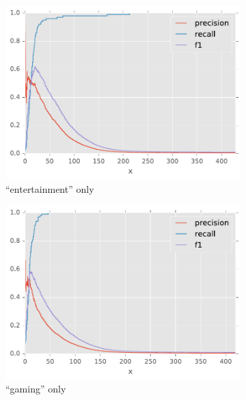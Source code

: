 \begin{figure}[H]
\begin{subfigure}[t]{.4\textwidth}
\centering\includegraphics[]{figures/reddit-entertainment-only-f1.pdf}
\caption{``entertainment'' only}
\label{fig-reddit-entertainment-only-f1}
\end{subfigure}
\begin{subfigure}[t]{.4\textwidth}
\centering\includegraphics[]{figures/reddit-gaming-only-f1.pdf}
\caption{``gaming'' only}
\label{fig-reddit-gaming-only-f1}
\end{subfigure}
\begin{subfigure}[t]{.4\textwidth}

\end{subfigure}
\end{figure}
